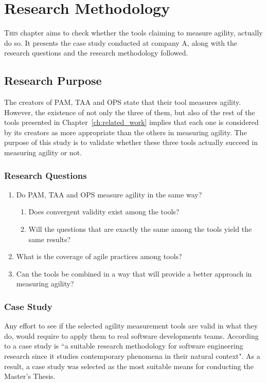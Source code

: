\chapter{Research Methodology}
\label{ch:research_methodology}


\lettrine[lines=4, loversize=-0.1, lraise=0.1]{T}{his} chapter aims to check whether the tools claiming to measure agility, actually do so. It presents the case study conducted at company A, along with the research questions and the research methodology followed.

\section{Research Purpose}
The creators of \ac{PAM}, \ac{TAA} and \ac{OPS} state that their tool measures agility. However, the existence of not only the three of them, but also of the rest of the tools presented in Chapter~\ref{ch:related_work} implies that each one is considered by its creators as more appropriate than the others in measuring agility. The purpose of this study is to validate whether these three tools actually succeed in measuring agility or not. 

\subsection{Research Questions}
\begin{enumerate}
	\item Do \ac{PAM}, \ac{TAA} and \ac{OPS} measure agility in the same way?
	\begin{enumerate}[label={\roman*)},align=left]
  		\item Does convergent validity exist among the tools?
  		\item Will the questions that are exactly the same among the tools yield the same results?
	\end{enumerate}	

	\item What is the coverage of agile practices among tools?
  	\item Can the tools be combined in a way that will provide a better approach in measuring agility?
\end{enumerate}

\subsection{Case Study}
Any effort to see if the selected agility measurement tools are valid in what they do, would require to apply them to real software developments teams. According to \citet{Runeson_Host} a case study is ``a suitable research methodology for software engineering research since it studies contemporary phenomena in their natural context". As a result, a case study was selected as the most suitable means for conducting the Master's Thesis.  

